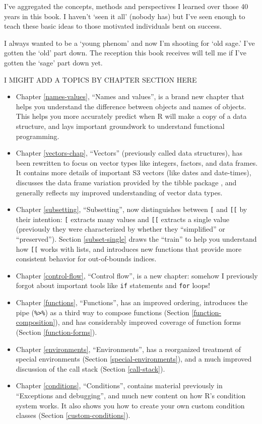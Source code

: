 \documentclass[
]{book}
\begin{document}
I've aggregated the concepts, methods and perspectives I learned over those 40 years in this book. I haven't `seen it all' (nobody has) but I've seen enough to teach these basic ideas to those motivated individuals bent on success.

I always wanted to be a `young phenom' and now I'm shooting for `old sage.' I've gotten the `old' part down. The reception this book receives will tell me if I've gotten the `sage' part down yet.

I MIGHT ADD A TOPICS BY CHAPTER SECTION HERE

\begin{itemize}
\item
  Chapter \ref{names-values}, ``Names and values'', is a brand new chapter
  that helps you understand the difference between objects and names of
  objects. This helps you more accurately predict when R will make a copy of
  a data structure, and lays important groundwork to understand functional
  programming.
\item
  Chapter \ref{vectors-chap}, ``Vectors'' (previously called data structures),
  has been rewritten to focus on vector types like integers, factors, and
  data frames. It contains more details of important S3 vectors (like dates
  and date-times), discusses the data frame variation provided by the
  tibble package \citep{tibble}, and generally reflects my improved understanding
  of vector data types.
\item
  Chapter \ref{subsetting}, ``Subsetting'', now distinguishes between \texttt{{[}} and
  \texttt{{[}{[}} by their intention: \texttt{{[}} extracts many values and \texttt{{[}{[}} extracts a
  single value (previously they were characterized by whether they ``simplified''
  or ``preserved''). Section \ref{subset-single} draws the ``train'' to help you
  understand how \texttt{{[}{[}} works with lists, and introduces new functions that
  provide more consistent behavior for out-of-bounds indices.
\item
  Chapter \ref{control-flow}, ``Control flow'', is a new chapter: somehow
  I previously forgot about important tools like \texttt{if} statements and \texttt{for}
  loops!
\item
  Chapter \ref{functions}, ``Functions'', has an improved ordering,
  introduces the pipe (\texttt{\%\textgreater{}\%}) as a third way to compose functions (Section
  \ref{function-composition}), and has considerably improved coverage of
  function forms (Section \ref{function-forms}).
\item
  Chapter \ref{environments}, ``Environments'', has a reorganized treatment of
  special environments (Section \ref{special-environments}), and a much
  improved discussion of the call stack (Section \ref{call-stack}).
\item
  Chapter \ref{conditions}, ``Conditions'', contains material previously
  in ``Exceptions and debugging'', and much new content on how R's condition
  system works. It also shows you how to create your own custom condition
  classes (Section \ref{custom-conditions}).
\end{itemize}
\end{document}
